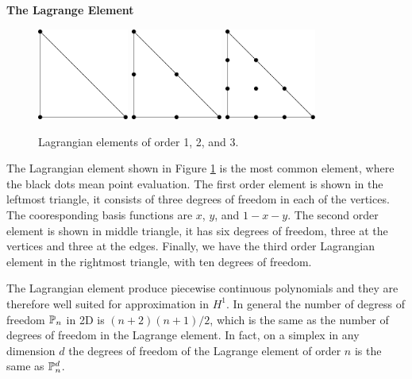 \begin{example}{\bf{The Lagrange Element}} \\
\begin{figure}[htb]
 \includegraphics[height=3cm]{chapters/kirby-1/eps/L1.xfig.eps} \hspace{1.0cm}
 \includegraphics[height=3cm]{chapters/kirby-1/eps/L2.xfig.eps} \hspace{1.0cm}
 \includegraphics[height=3cm]{chapters/kirby-1/eps/L3.xfig.eps}
\caption{Lagrangian elements of order 1, 2, and 3.}
\label{Lagrange}
\end{figure}
The Lagrangian element shown in Figure \ref{Lagrange} is the most common element, 
where the black dots mean point evaluation. 
The first order element is shown in the leftmost triangle, it consists of three
degrees of freedom in each of the vertices. The cooresponding basis functions
are $x$, $y$, and $1-x-y$.  The second order element is shown in middle
triangle, it has six degrees of freedom, three at the vertices and three
at the edges. Finally, we have the third order Lagrangian element in the rightmost
triangle, with ten degrees of freedom. 

The Lagrangian element produce piecewise continuous polynomials and they are therefore
well suited for approximation in $H^1$. 
In general the number of degress of freedom $\P_n$ in 2D 
is $(n+2)(n+1)/2$, which is the same as the number of degrees of freedom in the
Lagrange element. In fact, on a simplex in any dimension $d$ the degrees of freedom
of the Lagrange element of order $n$ is the same as $\P_n^d$.


\end{example}

